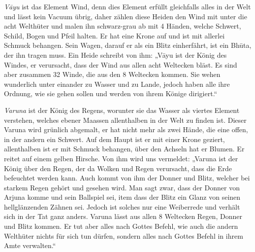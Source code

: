 \documentclass{article}
\begin{document}
\emph{V\={a}yu} ist das Element Wind, denn dies Element erfüllt gleichfalls alles in der Welt und lässt kein Vacuum übrig, daher zählen diese Heiden den Wind mit unter die acht Welthüter und malen ihn schwarz-grau ab mit 4 Händen, welche Schwert, Schild, Bogen und Pfeil halten. Er hat eine Krone auf und ist mit allerlei Schmuck behangen. Sein Wagen, darauf er als ein Blitz einherfährt, ist ein Bh\={u}ta, der ihn tragen muss. Ein Heide schreibt von ihm: „V\={a}yu ist der König des Windes, er verursacht, dass der Wind aus allen acht Weltecken bläst. Es sind aber zusammen 32 Winde, die aus den 8 Weltecken kommen. Sie wehen wunderlich unter einander zu Wasser und zu Lande, jedoch haben alle ihre Ordnung, wie sie gehen sollen und werden von ihrem Könige dirigiert.“

\emph{Varuna} ist der König des Regens, worunter sie das Wasser als viertes Element verstehen, welches ebener Maassen allenthalben in der Welt zu finden ist. Dieser Varuna wird grünlich abgemalt, er hat nicht mehr als zwei Hände, die eine offen, in der andern ein Schwert. Auf dem Haupt ist er mit einer Krone geziert, allenthalben ist er mit Schmuck behangen, über den Achseln hat er Blumen. Er reitet auf einem gelben Hirsche. Von ihm wird uns vermeldet: „Varuna ist der König über den Regen, der da Wolken und Regen verursacht, dass die Erde befeuchtet werden kann. Auch kommt von ihm der Donner und Blitz, welcher bei starkem Regen gehört und gesehen wird. Man sagt zwar, dass der Donner von Arjuna komme und sein Ballspiel sei, item dass der Blitz ein Glanz von seinen hellglänzenden Zähnen sei. Jedoch ist solches nur eine Weiberrede und verhält sich in der Tat ganz anders. Varuna lässt aus allen 8 Weltecken Regen, Donner und Blitz kommen. Er tut aber alles nach Gottes Befehl, wie auch die andern Welthüter nichts für sich tun dürfen, sondern alles nach Gottes Befehl in ihrem Amte verwalten.“
\end{document}
